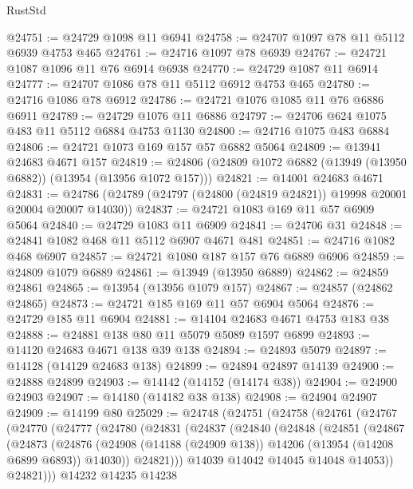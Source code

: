\begin{lexlean}{RustStd}
\begin{coremodule}
@24751 := @24729 @1098 @11 @6941
@24758 := @24707 @1097 @78 @11 @5112 @6939 @4753 @465
@24761 := @24716 @1097 @78 @6939
@24767 := @24721 @1087 @1096 @11 @76 @6914 @6938
@24770 := @24729 @1087 @11 @6914
@24777 := @24707 @1086 @78 @11 @5112 @6912 @4753 @465
@24780 := @24716 @1086 @78 @6912
@24786 := @24721 @1076 @1085 @11 @76 @6886 @6911
@24789 := @24729 @1076 @11 @6886
@24797 := @24706 @624 @1075 @483 @11 @5112 @6884 @4753 @1130
@24800 := @24716 @1075 @483 @6884
@24806 := @24721 @1073 @169 @157 @57 @6882 @5064
@24809 := @13941 @24683 @4671 @157
@24819 := @24806 (@24809 @1072 @6882 (@13949 (@13950 @6882)) (@13954 (@13956 @1072 @157)))
@24821 := @14001 @24683 @4671
@24831 := @24786 (@24789 (@24797 (@24800 (@24819 @24821)) @19998 @20001 @20004 @20007 @14030))
@24837 := @24721 @1083 @169 @11 @57 @6909 @5064
@24840 := @24729 @1083 @11 @6909
@24841 := @24706 @31
@24848 := @24841 @1082 @468 @11 @5112 @6907 @4671 @481
@24851 := @24716 @1082 @468 @6907
@24857 := @24721 @1080 @187 @157 @76 @6889 @6906
@24859 := @24809 @1079 @6889
@24861 := @13949 (@13950 @6889)
@24862 := @24859 @24861
@24865 := @13954 (@13956 @1079 @157)
@24867 := @24857 (@24862 @24865)
@24873 := @24721 @185 @169 @11 @57 @6904 @5064
@24876 := @24729 @185 @11 @6904
@24881 := @14104 @24683 @4671 @4753 @183 @38
@24888 := @24881 @138 @80 @11 @5079 @5089 @1597 @6899
@24893 := @14120 @24683 @4671 @138 @39 @138
@24894 := @24893 @5079
@24897 := @14128 (@14129 @24683 @138)
@24899 := @24894 @24897 @14139
@24900 := @24888 @24899
@24903 := @14142 (@14152 (@14174 @38))
@24904 := @24900 @24903
@24907 := @14180 (@14182 @38 @138)
@24908 := @24904 @24907
@24909 := @14199 @80
@25029 := @24748
    (@24751
      (@24758
        (@24761
          (@24767
            (@24770
              (@24777
                (@24780
                  (@24831
                    (@24837
                      (@24840
                        (@24848
                          (@24851
                            (@24867
                              (@24873
                                (@24876
                                  (@24908
                                    (@14188 (@24909 @138))
                                    @14206
                                    (@13954 (@14208 @6899 @6893))
                                    @14030))
                                @24821)))
                          @14039
                          @14042
                          @14045
                          @14048
                          @14053))
                      @24821)))
                @14232
                @14235
                @14238

\end{coremodule}
\end{lexlean}
